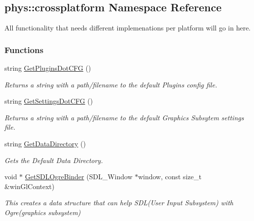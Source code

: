 \hypertarget{namespacephys_1_1crossplatform}{
\subsection{phys::crossplatform Namespace Reference}
\label{d4/d59/namespacephys_1_1crossplatform}
}


All functionality that needs different implemenations per platform will go in here.  


\subsubsection*{Functions}
\begin{DoxyCompactItemize}
\item 
string \hyperlink{namespacephys_1_1crossplatform_a8f7321f409f1f2a5fa07881ae22fcc2d}{GetPluginsDotCFG} ()
\begin{DoxyCompactList}\small\item\em Returns a string with a path/filename to the default Plugins config file. \item\end{DoxyCompactList}\item 
string \hyperlink{namespacephys_1_1crossplatform_a2d43f3aa5a485564c3f375b36a08152f}{GetSettingsDotCFG} ()
\begin{DoxyCompactList}\small\item\em Returns a string with a path/filename to the default Graphics Subsytem settings file. \item\end{DoxyCompactList}\item 
string \hyperlink{namespacephys_1_1crossplatform_ae7b1d4b6dac634392c6224f26ab85001}{GetDataDirectory} ()
\begin{DoxyCompactList}\small\item\em Gets the Default Data Directory. \item\end{DoxyCompactList}\item 
void $\ast$ \hyperlink{namespacephys_1_1crossplatform_a16d9a4174cbcac20670925e3d60465da}{GetSDLOgreBinder} (SDL\_\-Window $\ast$window, const size\_\-t \&winGlContext)
\begin{DoxyCompactList}\small\item\em This creates a data structure that can help SDL(User Input Subsystem) with Ogre(graphics subsystem) \item\end{DoxyCompactList}\item 

\end{DoxyCompactItemize}
